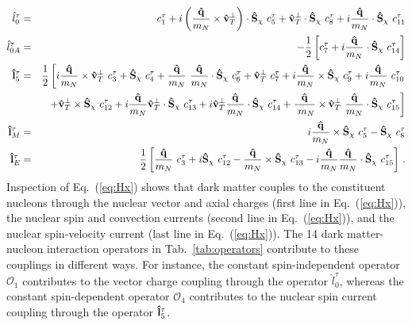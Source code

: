 \documentclass[11pt,a4paper]{article}
\begin{document}
\begin{eqnarray}
\label{eq:ls}
\hat{l}_0^\tau &=& c_1^\tau + i  \left( {{\bf{\hat{q}}} \over m_N}  \times {\bf{\hat{v}}}_{T}^\perp \right) \cdot  {\bf{\hat{S}}}_\chi  ~c_5^\tau
+ {\bf{\hat{v}}}_{T}^\perp \cdot {\bf{\hat{S}}}_\chi  ~c_8^\tau + i {{\bf{\hat{q}}} \over m_N} \cdot {\bf{\hat{S}}}_\chi ~c_{11}^\tau \nonumber \\
\hat{l}_{0A}^{\tau} &=& -{1 \over 2}  \left[ c_7 ^\tau  +i {{\bf{\hat{q}}} \over m_N} \cdot {\bf{\hat{S}}}_\chi~ c_{14}^\tau \right] \nonumber \\
{\bf{\hat{l}}}_5^{\tau}&=& {1 \over 2} \left[ i {{\bf{\hat{q}}} \over m_N} \times {\bf{\hat{v}}}_{T}^\perp~ c_3^\tau + {\bf{\hat{S}}}_\chi ~c_4^\tau
+  {{\bf{\hat{q}}} \over m_N}~{{\bf{\hat{q}}} \over m_N} \cdot {\bf{\hat{S}}}_\chi ~c_6^\tau
+   {\bf{\hat{v}}}_{T}^\perp ~c_7^\tau + i {{\bf{\hat{q}}} \over m_N} \times {\bf{\hat{S}}}_\chi ~c_9^\tau + i {{\bf{\hat{q}}} \over m_N}~c_{10}^\tau \right. \nonumber \\
 && \left.  +  {\bf{\hat{v}}}_{T}^\perp \times {\bf{\hat{S}}}_\chi ~c_{12}^\tau
+i  {{\bf{\hat{q}}} \over m_N} {\bf{\hat{v}}}_{T}^\perp \cdot {\bf{\hat{S}}}_\chi ~c_{13}^\tau+i {\bf{\hat{v}}}_{T}^\perp {{\bf{\hat{q}}} \over m_N} \cdot {\bf{\hat{S}}}_\chi ~ c_{14}^\tau+{{\bf{\hat{q}}} \over\
 m_N} \times {\bf{\hat{v}}}_{T}^\perp~ {{\bf{\hat{q}}} \over m_N} \cdot {\bf{\hat{S}}}_\chi ~ c_{15}^\tau  \right]\nonumber \\
{\bf{\hat{l}}}_M^{\tau} &=&   i {{\bf{\hat{q}}} \over m_N}  \times {\bf{\hat{S}}}_\chi ~c_5^\tau - {\bf{\hat{S}}}_\chi ~c_8^\tau \nonumber \\
{\bf{\hat{l}}}_E^{\tau} &=& {1 \over 2} \left[  {{\bf{\hat{q}}} \over m_N} ~ c_3^\tau +i {\bf{\hat{S}}}_\chi~c_{12}^\tau - {{\bf{\hat{q}}} \over  m_N} \times{\bf{\hat{S}}}_\chi  ~c_{13}^\tau-i 
{{\bf{\hat{q}}} \over  m_N} {{\bf{\hat{q}}} \over m_N} \cdot {\bf{\hat{S}}}_\chi  ~c_{15}^\tau \right] \,.
\end{eqnarray}
Inspection of Eq.~(\ref{eq:Hx}) shows that dark matter couples to the constituent nucleons through  the nuclear vector and axial charges (first line in Eq.~(\ref{eq:Hx})), the nuclear spin and convection currents (second line in Eq.~(\ref{eq:Hx})), and the nuclear spin-velocity current (last line in Eq.~(\ref{eq:Hx})).  The 14 dark matter-nucleon interaction operators in Tab.~\ref{tab:operators} contribute to these couplings in different ways. For instance, the constant spin-independent operator $\mathcal{O}_1$ contributes to the vector charge coupling through the operator $\hat{l}_0^\tau$, whereas the constant spin-dependent operator $\mathcal{O}_4$ contributes to the nuclear spin current coupling through the operator ${\bf{\hat{l}}}_5^{\tau}$.
\end{document}
